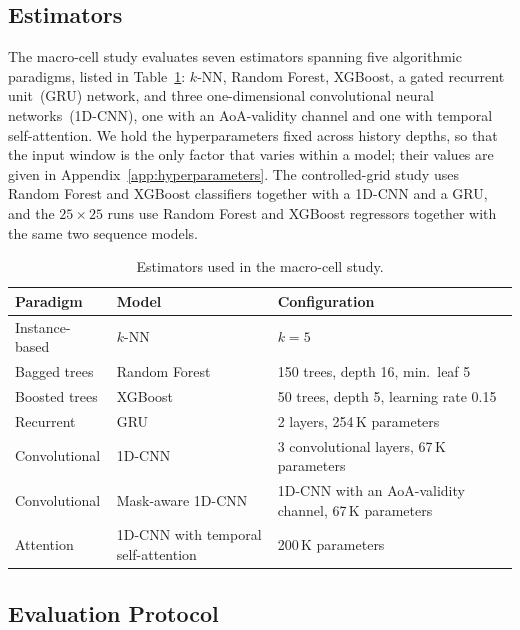 \subsection{Estimators}
\label{subsec:estimators}

The macro-cell study evaluates seven estimators spanning five algorithmic paradigms, listed in Table~\ref{tab:estimators}: $k$-NN, Random Forest, XGBoost, a gated recurrent unit~(GRU) network, and three one-dimensional convolutional neural networks~(1D-CNN), one with an AoA-validity channel and one with temporal self-attention. We hold the hyperparameters fixed across history depths, so that the input window is the only factor that varies within a model; their values are given in Appendix~\ref{app:hyperparameters}. The controlled-grid study uses Random Forest and XGBoost classifiers together with a 1D-CNN and a GRU, and the $25\times25$ runs use Random Forest and XGBoost regressors together with the same two sequence models.

\begin{table}[h]
  \centering
  \caption{Estimators used in the macro-cell study.}
  \label{tab:estimators}
  \small
  \begin{tabular}{@{}lll@{}}
    \toprule
    Paradigm & Model & Configuration \\
    \midrule
    Instance-based & $k$-NN & $k=5$ \\
    Bagged trees & Random Forest & 150 trees, depth 16, min.\ leaf 5 \\
    Boosted trees & XGBoost & 50 trees, depth 5, learning rate 0.15 \\
    Recurrent & GRU & 2 layers, 254\,K parameters \\
    Convolutional & 1D-CNN & 3 convolutional layers, 67\,K parameters \\
    Convolutional & Mask-aware 1D-CNN & 1D-CNN with an AoA-validity channel, 67\,K parameters \\
    Attention & 1D-CNN with temporal self-attention & 200\,K parameters \\
    \bottomrule
  \end{tabular}
\end{table}

\subsection{Evaluation Protocol}
\label{subsec:protocol}

